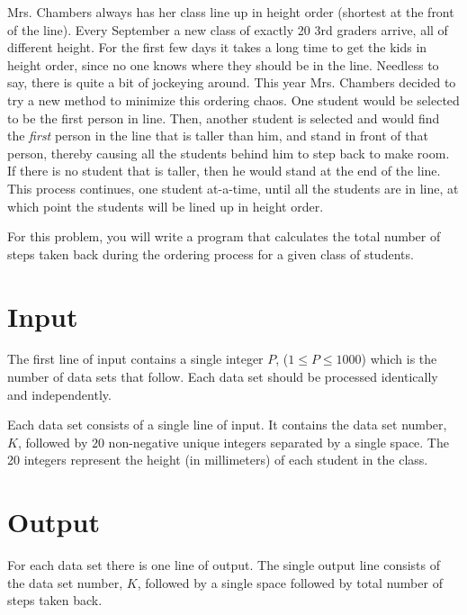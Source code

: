 
Mrs. Chambers always has her class line up in height order (shortest
at the front of the line).  Every September a new class of exactly 20
3rd graders arrive, all of different height. For the first few days it
takes a long time to get the kids in height order, since no one knows
where they should be in the line.  Needless to say, there is quite a
bit of jockeying around.  This year Mrs. Chambers decided to try a new
method to minimize this ordering chaos.  One student would be selected
to be the first person in line.  Then, another student is selected and
would find the \emph{first} person in the line that is taller than him, and
stand in front of that person, thereby causing all the students behind
him to step back to make room.  If there is no student that is taller,
then he would stand at the end of the line.  This process continues,
one student at-a-time, until all the students are in line, at which
point the students will be lined up in height order.

For this problem, you will write a program that calculates the total
number of steps taken back during the ordering process for a given class
of students.

\section*{Input}

The first line of input contains a single integer $P$, ($1 \le P \le 1000$) 
which is the number of data sets that follow.  Each data set should be 
processed identically and independently.

Each data set consists of a single line of input.  It contains the data
set number, $K$, followed by $20$ non-negative unique integers separated by
a single space.  The 20 integers represent the height (in millimeters)
of each student in the class.

\section*{Output}

For each data set there is one line of output.  The single output line
consists of the data set number, $K$, followed by a single space followed
by total number of steps taken back.

